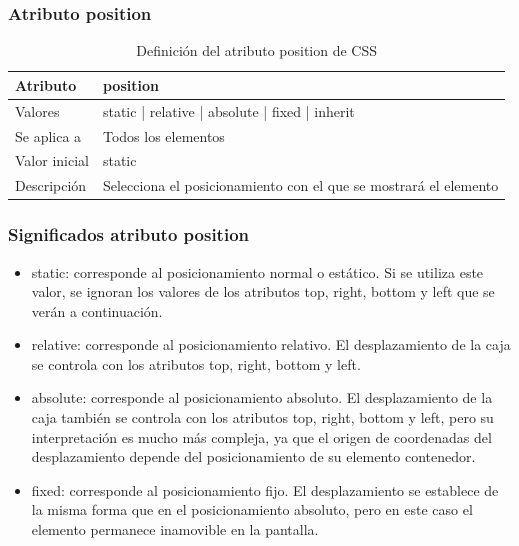\documentclass[ucs]{beamer}
\begin{document}

\begin{frame}
\frametitle{Atributo position}

\begin{center}
  \begin{table}
   \begin{tabular}{p{1.8cm}p{7.8cm}}
Atributo & \bf{position} \\ \hline
Valores& static | relative | absolute | fixed | inherit \\ \hline
Se aplica a& Todos los elementos \\ \hline
Valor inicial& static \\ \hline
Descripción& Selecciona el posicionamiento con el que se mostrará el elemento \\ \hline
  \end{tabular}
   \caption{Definición del atributo position de CSS}
 \end{table}
\end{center}


\end{frame}




\begin{frame}
\frametitle{Significados atributo position}

\begin{itemize}
  \item static: corresponde al posicionamiento normal o estático. Si se utiliza este valor, se ignoran los valores de los atributos top, right, bottom y left que se verán a continuación.
  \item relative: corresponde al posicionamiento relativo. El desplazamiento de la caja se controla con los atributos top, right, bottom y left.
  \item absolute: corresponde al posicionamiento absoluto. El desplazamiento de la caja también se controla con los atributos top, right, bottom y left, pero su interpretación es mucho más compleja, ya que el origen de coordenadas del desplazamiento depende del posicionamiento de su elemento contenedor.
  \item fixed: corresponde al posicionamiento fijo. El desplazamiento se establece de la misma forma que en el posicionamiento absoluto, pero en este caso el elemento permanece inamovible en la pantalla.
\end{itemize}

\end{frame}
\end{document}
